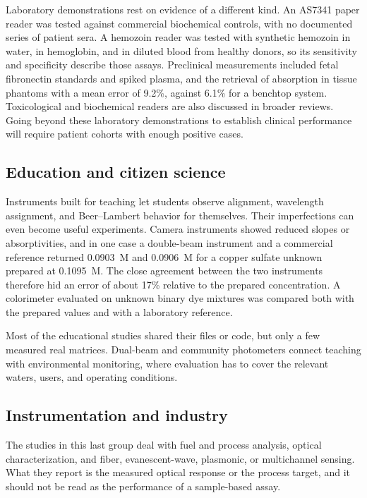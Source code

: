 Laboratory demonstrations rest on evidence of a different kind. An AS7341 paper reader was tested against commercial biochemical controls, with no documented series of patient sera.\citep{palekar2025microfluidic} A hemozoin reader was tested with synthetic hemozoin in water, in hemoglobin, and in diluted blood from healthy donors, so its sensitivity and specificity describe those assays.\citep{catarino2020portable} Preclinical measurements included fetal fibronectin standards and spiked plasma,\citep{long2017multimode} and the retrieval of absorption in tissue phantoms with a mean error of 9.2\%, against 6.1\% for a benchtop system.\citep{edwards2017smartphone} Toxicological and biochemical readers\citep{wang2016smartphone,kong2020novel,yu2023open} are also discussed in broader reviews.\citep{hussain2021smartphone,geng2017recent} Going beyond these laboratory demonstrations to establish clinical performance will require patient cohorts with enough positive cases.

\subsection{Education and citizen science}

Instruments built for teaching let students observe alignment, wavelength assignment, and Beer--Lambert behavior for themselves.\citep{gonzalezlaprea2025d,vusirikala2026bringing} Their imperfections can even become useful experiments. Camera instruments showed reduced slopes or absorptivities,\citep{grasse2015teaching,nguyen2025portable,bruininks2022inexpensive} and in one case a double-beam instrument and a commercial reference returned 0.0903~M and 0.0906~M for a copper sulfate unknown prepared at 0.1095~M.\citep{winters2021d} The close agreement between the two instruments therefore hid an error of about 17\% relative to the prepared concentration. A colorimeter evaluated on unknown binary dye mixtures was compared both with the prepared values and with a laboratory reference.\citep{clippard2016construction}

Most of the educational studies shared their files or code, but only a few measured real matrices. Dual-beam and community photometers connect teaching with environmental monitoring,\citep{feng2021open,cirrone2025low,konnel2025low} where evaluation has to cover the relevant waters, users, and operating conditions.\citep{cirrone2026analytical}

\subsection{Instrumentation and industry}

The studies in this last group deal with fuel and process analysis,\citep{dantas2017inexpensive,glotz2018design,vidal2021brand} optical characterization,\citep{berglund2022enabling,matinrad2020systematic,firago2022diffuse,hotra2022investigation,perezavila2024assessment} and fiber, evanescent-wave, plasmonic, or multichannel sensing.\citep{markvart2020continuous,dutta2014evanescent,lo2019concave,biswas2020multichannel} What they report is the measured optical response or the process target, and it should not be read as the performance of a sample-based assay.
